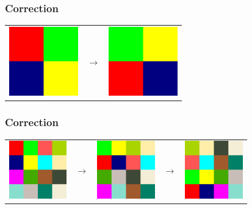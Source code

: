 \documentclass[svgnames,11pt]{beamer}
\begin{document}
\begin{frame}
    \frametitle{Correction}

    \begin{center}
        \begin{tabular}{ccc}
            \includegraphics[width=3cm]{ressources/carre1.png}
             & $$\rightarrow$$
             &
            \includegraphics[width=3cm]{ressources/carre1-rot.png}
            \\
        \end{tabular}
    \end{center}
\end{frame}
\begin{frame}
    \frametitle{Correction}

    \begin{center}
        \begin{tabular}{ccccc}
            \includegraphics[width=2.5cm]{ressources/carre2.png}
             & $$\rightarrow$$
             &
            \includegraphics[width=2.5cm]{ressources/carre2-int.png}
             & $$\rightarrow$$
             &
            \includegraphics[width=2.5cm]{ressources/carre2-rot.png}
            \\
        \end{tabular}
    \end{center}

\end{frame}
\end{document}
